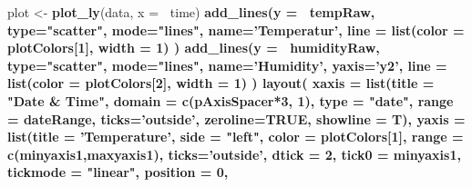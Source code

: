 \documentclass[
  a4paperpaper,
]{book}
\newenvironment{Shaded}{\begin{snugshade}}{\end{snugshade}}
\newcommand{\DataTypeTok}[1]{\textcolor[rgb]{0.13,0.29,0.53}{#1}}
\newcommand{\DecValTok}[1]{\textcolor[rgb]{0.00,0.00,0.81}{#1}}
\newcommand{\KeywordTok}[1]{\textcolor[rgb]{0.13,0.29,0.53}{\textbf{#1}}}
\newcommand{\NormalTok}[1]{#1}
\newcommand{\OperatorTok}[1]{\textcolor[rgb]{0.81,0.36,0.00}{\textbf{#1}}}
\newcommand{\OtherTok}[1]{\textcolor[rgb]{0.56,0.35,0.01}{#1}}
\newcommand{\StringTok}[1]{\textcolor[rgb]{0.31,0.60,0.02}{#1}}
\let\oldShaded\Shaded
\let\endoldShaded\endShaded
\renewenvironment{Shaded}{\footnotesize\oldShaded}{\endoldShaded}
\begin{document}
\begin{Shaded}
\begin{Highlighting}[]
{\NormalTok{plot <-}\StringTok{ }\KeywordTok{plot_ly}\NormalTok{(data, }\DataTypeTok{x =} \OperatorTok{~}\NormalTok{time) }\OperatorTok{%
\StringTok{  }\KeywordTok{add_lines}\NormalTok{(}\DataTypeTok{y =} \OperatorTok{~}\NormalTok{tempRaw, }
            \DataTypeTok{type=}\StringTok{"scatter"}\NormalTok{,}
            \DataTypeTok{mode=}\StringTok{"lines"}\NormalTok{,}
            \DataTypeTok{name=}\StringTok{'Temperatur'}\NormalTok{,}
            \DataTypeTok{line =} \KeywordTok{list}\NormalTok{(}\DataTypeTok{color =}\NormalTok{ plotColors[}\DecValTok{1}\NormalTok{], }\DataTypeTok{width =} \DecValTok{1}\NormalTok{)}
\NormalTok{            ) }\OperatorTok{%
\StringTok{  }\KeywordTok{add_lines}\NormalTok{(}\DataTypeTok{y =} \OperatorTok{~}\NormalTok{humidityRaw, }
            \DataTypeTok{type=}\StringTok{"scatter"}\NormalTok{,}
            \DataTypeTok{mode=}\StringTok{"lines"}\NormalTok{,}
            \DataTypeTok{name=}\StringTok{'Humidity'}\NormalTok{,}
            \DataTypeTok{yaxis=}\StringTok{'y2'}\NormalTok{, }
            \DataTypeTok{line =} \KeywordTok{list}\NormalTok{(}\DataTypeTok{color =}\NormalTok{ plotColors[}\DecValTok{2}\NormalTok{], }\DataTypeTok{width =} \DecValTok{1}\NormalTok{)}
\NormalTok{            ) }\OperatorTok{%
\StringTok{  }\KeywordTok{layout}\NormalTok{(}
    \DataTypeTok{xaxis =} \KeywordTok{list}\NormalTok{(}\DataTypeTok{title =} \StringTok{"Date & Time"}\NormalTok{, }
                 \DataTypeTok{domain =} \KeywordTok{c}\NormalTok{(pAxisSpacer}\OperatorTok{*}\DecValTok{3}\NormalTok{, }\DecValTok{1}\NormalTok{), }
                 \DataTypeTok{type =} \StringTok{"date"}\NormalTok{,}
                 \DataTypeTok{range =}\NormalTok{ dateRange, }
                 \DataTypeTok{ticks=}\StringTok{'outside'}\NormalTok{, }
                 \DataTypeTok{zeroline=}\OtherTok{TRUE}\NormalTok{, }
                 \DataTypeTok{showline =}\NormalTok{ T),}
    \DataTypeTok{yaxis =} \KeywordTok{list}\NormalTok{(}\DataTypeTok{title =} \StringTok{'Temperature'}\NormalTok{, }
                 \DataTypeTok{side =} \StringTok{"left"}\NormalTok{, }
                 \DataTypeTok{color =}\NormalTok{ plotColors[}\DecValTok{1}\NormalTok{], }
                 \DataTypeTok{range =} \KeywordTok{c}\NormalTok{(minyaxis1,maxyaxis1), }
                 \DataTypeTok{ticks=}\StringTok{'outside'}\NormalTok{, }
                 \DataTypeTok{dtick =} \DecValTok{2}\NormalTok{, }
                 \DataTypeTok{tick0 =}\NormalTok{ minyaxis1, }
                 \DataTypeTok{tickmode =} \StringTok{"linear"}\NormalTok{,}
                 \DataTypeTok{position =} \DecValTok{0}\NormalTok{,}
}}}}
\end{Highlighting}
\end{Shaded}
\end{document}
